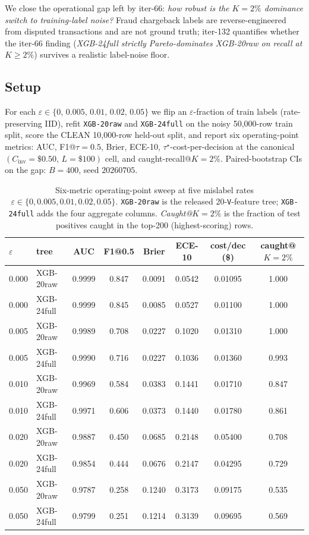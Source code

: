 \documentclass{article}
\begin{document}
We close the operational gap left by iter-66: \emph{how robust is the
$K{=}2\%$ dominance switch to training-label noise?} Fraud chargeback
labels are reverse-engineered from disputed transactions and are not
ground truth; iter-132 quantifies whether the iter-66 finding
(\textit{XGB-24full strictly Pareto-dominates XGB-20raw on recall at
$K{\geq}2\%$}) survives a realistic label-noise floor.

\subsection{Setup}

For each $\varepsilon \in \{0,\,0.005,\,0.01,\,0.02,\,0.05\}$ we flip
an $\varepsilon$-fraction of train labels (rate-preserving IID), refit
\texttt{XGB-20raw} and \texttt{XGB-24full} on the noisy 50,000-row
train split, score the CLEAN 10,000-row held-out split, and report six
operating-point metrics: AUC, F1@$\tau{=}0.5$, Brier, ECE-10,
$\tau^{\star}$-cost-per-decision at the canonical
$(C_{\mathrm{inv}}{=}\$0.50,\,L{=}\$100)$ cell, and caught-recall@$K{=}2\%$.
Paired-bootstrap CIs on the gap: $B{=}400$, seed $20260705$.

\begin{table}[t]
\centering\small
\caption{Six-metric operating-point sweep at five mislabel rates
$\varepsilon \in \{0, 0.005, 0.01, 0.02, 0.05\}$. \texttt{XGB-20raw} is
the released 20-\texttt{V}-feature tree; \texttt{XGB-24full} adds the
four aggregate columns. \emph{Caught@$K{=}2\%$} is the fraction of
test positives caught in the top-200 (highest-scoring) rows.}
\label{tab:p8-mislabel-main}
\begin{tabular}{llcccccc}
\toprule
$\varepsilon$ & tree       & AUC    & F1@0.5 & Brier & ECE-10 & cost/dec (\$) & caught@$K{=}2\%$ \\
\midrule
0.000 & XGB-20raw  & 0.9999 & 0.847  & 0.0091 & 0.0542 & 0.01095 & 1.000 \\
0.000 & XGB-24full & 0.9999 & 0.845  & 0.0085 & 0.0527 & 0.01100 & 1.000 \\
0.005 & XGB-20raw  & 0.9989 & 0.708  & 0.0227 & 0.1020 & 0.01310 & 1.000 \\
0.005 & XGB-24full & 0.9990 & 0.716  & 0.0227 & 0.1036 & 0.01360 & 0.993 \\
0.010 & XGB-20raw  & 0.9969 & 0.584  & 0.0383 & 0.1441 & 0.01710 & 0.847 \\
0.010 & XGB-24full & 0.9971 & 0.606  & 0.0373 & 0.1440 & 0.01780 & 0.861 \\
0.020 & XGB-20raw  & 0.9887 & 0.450  & 0.0685 & 0.2148 & 0.05400 & 0.708 \\
0.020 & XGB-24full & 0.9854 & 0.444  & 0.0676 & 0.2147 & 0.04295 & 0.729 \\
0.050 & XGB-20raw  & 0.9787 & 0.258  & 0.1240 & 0.3173 & 0.09175 & 0.535 \\
0.050 & XGB-24full & 0.9799 & 0.251  & 0.1214 & 0.3139 & 0.09695 & 0.569 \\
\bottomrule
\end{tabular}
\end{table}
\end{document}
